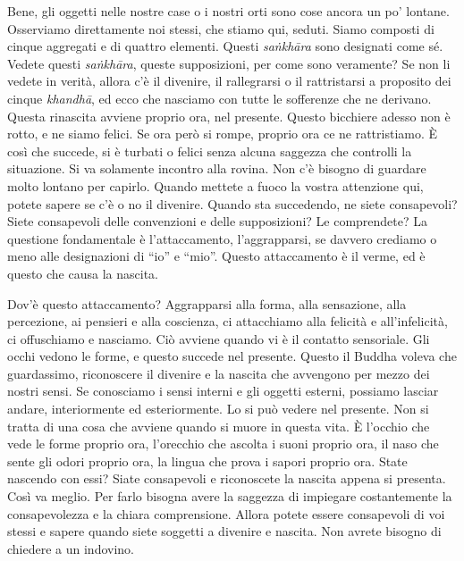 Bene, gli oggetti nelle nostre case o i nostri orti sono cose ancora un
po' lontane. Osserviamo direttamente noi stessi, che stiamo qui, seduti.
Siamo composti di cinque aggregati e di quattro elementi. Questi
\emph{saṅkhāra} sono designati come sé. Vedete questi \emph{saṅkhāra},
queste supposizioni, per come sono veramente? Se non li vedete in
verità, allora c'è il divenire, il rallegrarsi o il rattristarsi a
proposito dei cinque \emph{khandhā}, ed ecco che nasciamo con tutte le
sofferenze che ne derivano. Questa rinascita avviene proprio ora, nel
presente. Questo bicchiere adesso non è rotto, e ne siamo felici. Se ora
però si rompe, proprio ora ce ne rattristiamo. È così che succede, si è
turbati o felici senza alcuna saggezza che controlli la situazione. Si
va solamente incontro alla rovina. Non c'è bisogno di guardare molto
lontano per capirlo. Quando mettete a fuoco la vostra attenzione qui,
potete sapere se c'è o no il divenire. Quando sta succedendo, ne siete
consapevoli? Siete consapevoli delle convenzioni e delle supposizioni?
Le comprendete? La questione fondamentale è l'attaccamento,
l'aggrapparsi, se davvero crediamo o meno alle designazioni di ``io'' e
``mio''. Questo attaccamento è il verme, ed è questo che causa la
nascita.

Dov'è questo attaccamento? Aggrapparsi alla forma, alla sensazione, alla
percezione, ai pensieri e alla coscienza, ci attacchiamo alla felicità e
all'infelicità, ci offuschiamo e nasciamo. Ciò avviene quando vi è il
contatto sensoriale. Gli occhi vedono le forme, e questo succede nel
presente. Questo il Buddha voleva che guardassimo, riconoscere il
divenire e la nascita che avvengono per mezzo dei nostri sensi. Se
conosciamo i sensi interni e gli oggetti esterni, possiamo lasciar
andare, interiormente ed esteriormente. Lo si può vedere nel presente.
Non si tratta di una cosa che avviene quando si muore in questa vita. È
l'occhio che vede le forme proprio ora, l'orecchio che ascolta i suoni
proprio ora, il naso che sente gli odori proprio ora, la lingua che
prova i sapori proprio ora. State nascendo con essi? Siate consapevoli e
riconoscete la nascita appena si presenta. Così va meglio. Per farlo
bisogna avere la saggezza di impiegare costantemente la consapevolezza e
la chiara comprensione. Allora potete essere consapevoli di voi stessi e
sapere quando siete soggetti a divenire e nascita. Non avrete bisogno di
chiedere a un indovino.

